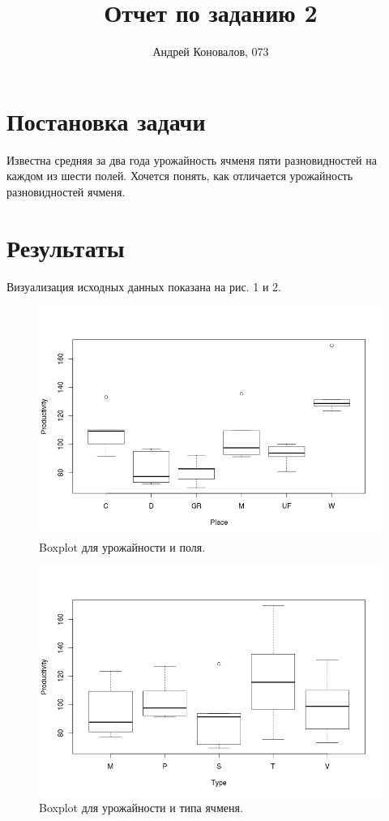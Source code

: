 \documentclass[10pt]{article}
\title{Отчет по заданию 2}
\author{Андрей Коновалов, 073}
\date{}
\begin{document}
\maketitle

\section{Постановка задачи}

Известна средняя за два года урожайность ячменя пяти разновидностей на каждом из шести полей.
Хочется понять, как отличается урожайность разновидностей ячменя.

\section{Результаты}

Визуализация исходных данных показана на рис. 1 и 2.

\begin{figure}[h]
  \centering
  \includegraphics[scale=0.4]{overview_place.png}
  \caption{Boxplot для урожайности и поля.}
\end{figure}

\begin{figure}[h]
  \centering
  \includegraphics[scale=0.4]{overview_type.png}
  \caption{Boxplot для урожайности и типа ячменя.}
\end{figure}
\end{document}
